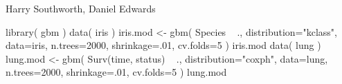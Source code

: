 \documentclass{article}
\begin{document}
\begin{Author}\relax
Harry Southworth, Daniel Edwards
\end{Author}
\begin{SeeAlso}\relax
{}
\end{SeeAlso}
\begin{Examples}
\begin{ExampleCode}
library( gbm )
data( iris )
iris.mod <- gbm( Species ~ ., distribution="kclass", data=iris,
                 n.trees=2000, shrinkage=.01, cv.folds=5 )
iris.mod
data( lung )
lung.mod <- gbm( Surv(time, status) ~ ., distribution="coxph", data=lung,
                 n.trees=2000, shrinkage=.01, cv.folds=5 )
lung.mod
\end{ExampleCode}
\end{Examples}
\end{document}
